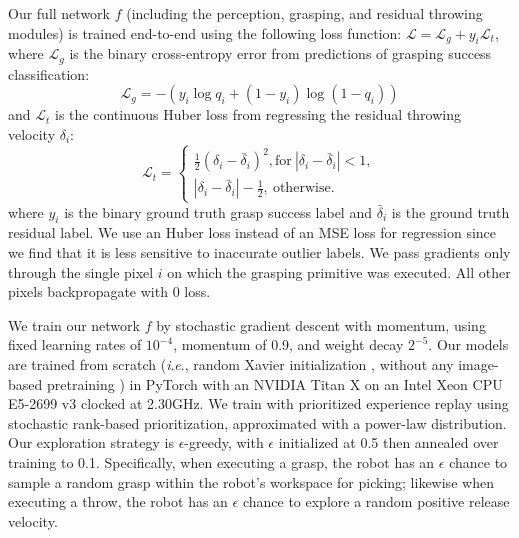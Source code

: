 \documentclass[journal]{IEEEtran}
\newcommand{\ie}{\textit{i}.\textit{e}., }
\begin{document}
Our full network $f$ (including the perception, grasping, and residual throwing modules) is trained end-to-end using the following loss function: $\mathcal{L}=\mathcal{L}_g+y_i\mathcal{L}_t$,
where $\mathcal{L}_g$ is the binary cross-entropy error from predictions of grasping success classification:
$$\mathcal{L}_g=-(y_i\log{q_i}+(1-y_i)\log(1-q_i))$$
and $\mathcal{L}_t$ is the continuous Huber loss from regressing the residual throwing velocity $\delta_i$:
$$\mathcal{L}_t=\left\{\begin{array}{ll} \frac{1}{2}(\delta_i-\bar{\delta}_i)^2, \mathrm{for}\:|\delta_i-\bar{\delta}_i| < 1,\\
                  |\delta_i-\bar{\delta}_i| - \frac{1}{2},\:\mathrm{otherwise.}\end{array}\right.$$
\noindent where $y_i$ is the binary ground truth grasp success label and $\bar{\delta}_i$ is the ground truth residual label. We use an Huber loss \cite{girshick2015fast} instead of an MSE loss for regression since we find that it is less sensitive to inaccurate outlier labels. We pass gradients only through the single pixel $i$ on which the grasping primitive was executed. All other pixels backpropagate with 0 loss. %

We train our network $f$ by stochastic gradient descent with momentum, using fixed learning rates of $10^{-4}$, momentum of 0.9, and weight decay $2^{-5}$. Our models are trained from scratch (\ie random Xavier initialization \cite{glorot2010understanding}, without any image-based pretraining \cite{yen2020learning}) in PyTorch with an NVIDIA Titan X on an Intel Xeon CPU E5-2699 v3 clocked at 2.30GHz.
We train with prioritized experience replay \cite{schaul2015prioritized} using stochastic rank-based prioritization, approximated with a power-law distribution. Our exploration strategy is $\epsilon$-greedy, with $\epsilon$ initialized at 0.5 then annealed over training to 0.1. Specifically, when executing a grasp, the robot has an $\epsilon$ chance to sample a random grasp within the robot's workspace for picking; likewise when executing a throw, the robot has an $\epsilon$ chance to explore a random positive release velocity. %

\end{document}

